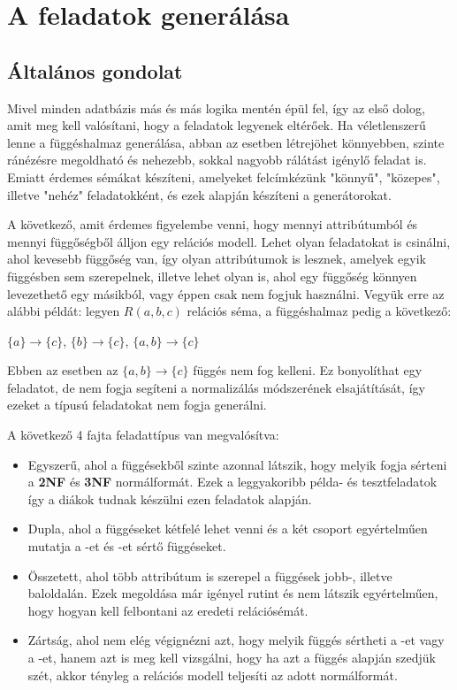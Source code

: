 \chapter{A feladatok generálása}

\section{Általános gondolat}
Mivel minden adatbázis más és más logika mentén épül fel, így az első dolog, amit meg kell valósítani, hogy a feladatok legyenek eltérőek. Ha véletlenszerű lenne a függéshalmaz generálása, abban az esetben létrejöhet könnyebben, szinte ránézésre megoldható és nehezebb, sokkal nagyobb rálátást igénylő feladat is. Emiatt érdemes sémákat készíteni, amelyeket felcímkézünk "könnyű", "közepes", illetve "nehéz" feladatokként, és ezek alapján készíteni a generátorokat. \par
A következő, amit érdemes figyelembe venni, hogy mennyi attribútumból és mennyi függőségből álljon egy relációs modell. Lehet olyan feladatokat is csinálni, ahol kevesebb függőség van, így olyan attribútumok is lesznek, amelyek egyik függésben sem szerepelnek, illetve lehet olyan is, ahol egy függőség könnyen levezethető egy másikból, vagy éppen csak nem fogjuk használni. Vegyük erre az alábbi példát: legyen $R(a,b,c)$ relációs séma, a függéshalmaz pedig a következő:
\begin{center}
    $\{a\} \longrightarrow \{c\}$, $\{b\} \longrightarrow \{c\}$, $\{a,b\} \longrightarrow \{c\}$
\end{center}
Ebben az esetben az $\{a,b\} \rightarrow \{c\}$ függés nem fog kelleni. Ez bonyolíthat egy feladatot, de nem fogja segíteni a normalizálás módszerének elsajátítását, így ezeket a típusú feladatokat nem fogja generálni. \par
A következő 4 fajta feladattípus van megvalósítva:
\begin{itemize}
    \item Egyszerű, ahol a függésekből szinte azonnal látszik, hogy melyik fogja sérteni a \textbf{2NF} és \textbf{3NF} normálformát. Ezek a leggyakoribb példa- és tesztfeladatok így a diákok tudnak készülni ezen feladatok alapján.
    \item Dupla, ahol a függéseket kétfelé lehet venni és a két csoport egyértelműen mutatja a \nfk-et és \nfh-et sértő függéseket.
    \item Összetett, ahol több attribútum is szerepel a függések jobb-, illetve baloldalán. Ezek megoldása már igényel rutint és nem látszik egyértelműen, hogy hogyan kell felbontani az eredeti relációsémát.
    \item Zártság, ahol nem elég végignézni azt, hogy melyik függés sértheti a \nfk-et vagy a \nfh-et, hanem azt is meg kell vizsgálni, hogy ha azt a függés alapján szedjük szét, akkor tényleg a relációs modell teljesíti az adott normálformát.
\end{itemize}

